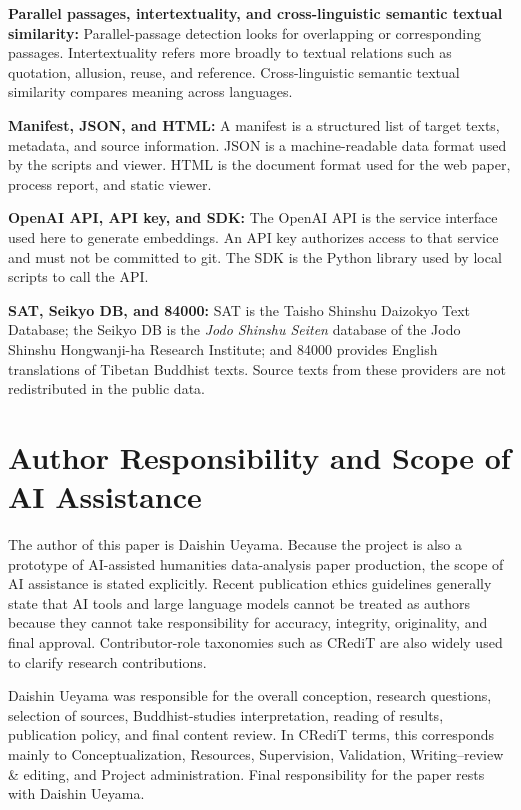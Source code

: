 \documentclass[uplatex,dvipdfmx,11pt,a4paper]{jsarticle}
\begin{document}
\noindent\textbf{Parallel passages, intertextuality, and cross-linguistic semantic textual similarity:} Parallel-passage detection looks for overlapping or corresponding passages. Intertextuality refers more broadly to textual relations such as quotation, allusion, reuse, and reference. Cross-linguistic semantic textual similarity compares meaning across languages.

\noindent\textbf{Manifest, JSON, and HTML:} A manifest is a structured list of target texts, metadata, and source information. JSON is a machine-readable data format used by the scripts and viewer. HTML is the document format used for the web paper, process report, and static viewer.

\noindent\textbf{OpenAI API, API key, and SDK:} The OpenAI API is the service interface used here to generate embeddings. An API key authorizes access to that service and must not be committed to git. The SDK is the Python library used by local scripts to call the API.

\noindent\textbf{SAT, Seikyo DB, and 84000:} SAT is the Taisho Shinshu Daizokyo Text Database; the Seikyo DB is the \textit{Jodo Shinshu Seiten} database of the Jodo Shinshu Hongwanji-ha Research Institute; and 84000 provides English translations of Tibetan Buddhist texts. Source texts from these providers are not redistributed in the public data.

\section*{Author Responsibility and Scope of AI Assistance}

The author of this paper is Daishin Ueyama. Because the project is also a prototype of AI-assisted humanities data-analysis paper production, the scope of AI assistance is stated explicitly. Recent publication ethics guidelines generally state that AI tools and large language models cannot be treated as authors because they cannot take responsibility for accuracy, integrity, originality, and final approval\cite{icmje-ai,elsevier-ai,springer-ai}. Contributor-role taxonomies such as CRediT are also widely used to clarify research contributions\cite{credit-taxonomy}.

Daishin Ueyama was responsible for the overall conception, research questions, selection of sources, Buddhist-studies interpretation, reading of results, publication policy, and final content review. In CRediT terms, this corresponds mainly to Conceptualization, Resources, Supervision, Validation, Writing--review \& editing, and Project administration. Final responsibility for the paper rests with Daishin Ueyama.
\end{document}
